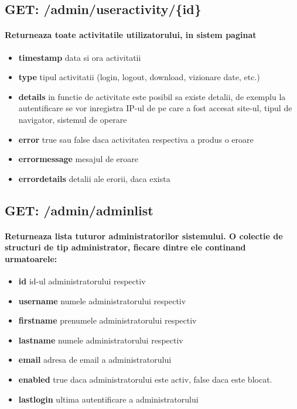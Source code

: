  \subsection*{GET: /admin/useractivity/\{id\}}

\paragraph{Returneaza toate activitatile utilizatorului, in sistem paginat}
\begin{itemize}
\item \textbf{timestamp}
 data si ora activitatii
\item \textbf{type}
 tipul activitatii (login, logout, download, vizionare date, etc.)
\item \textbf{details}
 in functie de activitate este posibil sa existe detalii, de exemplu la autentificare se vor inregistra IP-ul de pe care a fost accesat site-ul, tipul de navigator, sistemul de operare
\item \textbf{error}
 true sau false daca activitatea respectiva a produs o eroare
\item \textbf{errormessage}
 mesajul de eroare
\item \textbf{errordetails}
 detalii ale erorii, daca exista
 \end{itemize}
 \subsection*{GET: /admin/adminlist}

\paragraph{Returneaza lista tuturor administratorilor sistemului. O colectie de structuri de tip administrator, fiecare dintre ele continand urmatoarele:}
\begin{itemize}
\item \textbf{id}
 id-ul administratorului respectiv
\item \textbf{username}
 numele administratorului respectiv
\item \textbf{firstname}
 prenumele administratorului respectiv
\item \textbf{lastname}
 numele administratorului respectiv
\item \textbf{email}
 adresa de email a administratorului
\item \textbf{enabled}
 true daca administratorului este activ, false daca este blocat. 
\item \textbf{lastlogin}
 ultima autentificare a administratorului
 \end{itemize}
